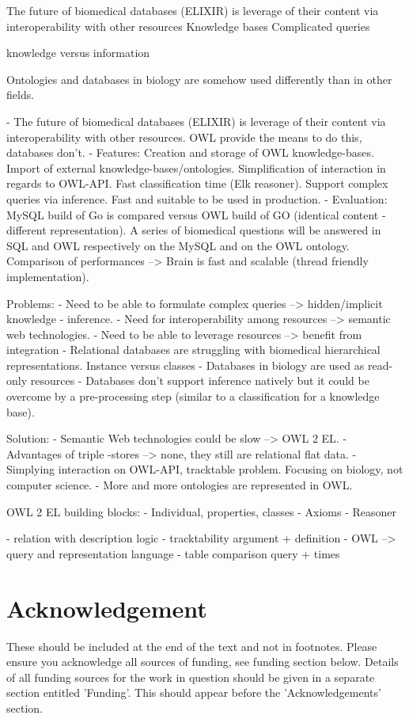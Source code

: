 \documentclass{bioinfo}
\begin{document}
The future of biomedical databases (ELIXIR) is leverage of their content via interoperability with other resources
Knowledge bases
Complicated queries

knowledge versus information





Ontologies and databases in biology are somehow used differently than in other fields. 

- The future of biomedical databases (ELIXIR) is leverage of their content via interoperability with other resources.
OWL provide the means to do this, databases don't.
- Features: Creation and storage of OWL knowledge-bases. 
Import of external knowledge-bases/ontologies. 
Simplification of interaction in regards to OWL-API. Fast classification time (Elk reasoner). 
Support complex queries via inference. Fast and suitable to be used in production.
- Evaluation: MySQL build of Go is compared versus OWL build of GO (identical content - different representation).
A series of biomedical questions will be answered in SQL and OWL respectively on the MySQL and on the OWL ontology.
Comparison of performances --> Brain is fast and scalable (thread friendly implementation).

Problems:
- Need to be able to formulate complex queries --> hidden/implicit knowledge - inference.
- Need for interoperability among resources --> semantic web technologies.
- Need to be able to leverage resources --> benefit from integration
- Relational databases are struggling with biomedical hierarchical representations. Instance versus classes
- Databases in biology are used as read-only resources
- Databases don't support inference natively but it could be overcome by a
 pre-processing step (similar to a classification for a knowledge base).

Solution:
- Semantic Web technologies could be slow --> OWL 2 EL.
- Advantages of triple -stores --> none, they still are relational flat data.
- Simplying interaction on OWL-API, tracktable problem. Focusing on biology, not computer science.
- More and more ontologies are represented in OWL.

OWL 2 EL building blocks:
- Individual, properties, classes
- Axioms
- Reasoner

- relation with description logic
- tracktability argument + definition
- OWL --> query and representation language
- table comparison query + times



\section*{Acknowledgement}
These should be included at the end of the text and not in footnotes. Please ensure you acknowledge all 
sources of funding, see funding section below.
Details of all funding sources for the work in question should be given 
in a separate section entitled 'Funding'. This should appear before the 'Acknowledgements' section.
\end{document}
